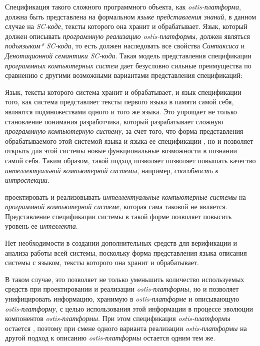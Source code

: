 Спецификация такого сложного программного объекта, как \textit{ostis-платформа}, должна быть представлена на формальном \textit{языке представления знаний}, в данном случае на \textit{SC-коде}, тексты которого она хранит и обрабатывает. Язык, который должен описывать \textit{программную реализацию ostis-платформы}, должен являться \textit{подъязыком*} \textit{SC-кода}, то есть должен наследовать все свойства \textit{Синтаксиса} и \textit{Денотационной семантики SC-кода}. Такая модель представления спецификации \textit{программных компьютерных систем} дает безусловно сильные преимущества по сравнению с другими возможными вариантами представления спецификаций:
\begin{textitemize}
    \item Язык, тексты которого система хранит и обрабатывает, и язык спецификации того, как система представляет тексты первого языка в памяти самой себя, являются подмножествами одного и того же языка. Это упрощает не только становление понимания разработчика, который разрабатывает сложную \textit{программную компьютерную систему}, за счет того, что форма представления обрабатываемого этой системой языка и языка ее спецификации , но и позволяет открыть для этой системы новые функциональные возможности в познании самой себя. Таким образом, такой подход позволяет позволяет повышать качество \textit{интеллектуальной компьютерной системы}, например, \textit{способность к интроспекции}.
    \item {} проектировать и реализовывать \textit{интеллектуальные компьютерные системы} на \textit{программной компьютерной системе}, которая сама таковой не является. Представление спецификации системы в такой форме позволяет повысить уровень ее \textit{интеллекта}.
    \item Нет необходимости в создании дополнительных средств для верификации и анализа работы всей системы, поскольку форма представления языка описания системы  с языком, тексты которого она хранит и обрабатывает.
\end{textitemize}

В таком случае, это позволяет не только уменьшить количество используемых средств при проектировании и реализации \textit{ostis-платформы}, но и позволяет унифицировать информацию, хранимую в \textit{ostis-платформе} и описывающую \textit{ostis-платформу}, с целью использования этой информации в процессе эволюции компонентов \textit{ostis-платформы}. При этом спецификация \textit{ostis-платформы} остается , поэтому при смене одного варианта реализации \textit{ostis-платформы} на другой подход к описанию \textit{ostis-платформы} остается одним тем же.

